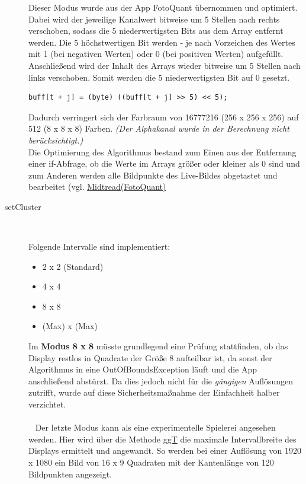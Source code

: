 \begin{description}
Dieser Modus wurde aus der App FotoQuant übernommen und optimiert. \\
Dabei wird der jeweilige Kanalwert bitweise um 5 Stellen nach rechts verschoben, sodass die 5 niederwertigsten Bits  aus dem Array entfernt werden. 
Die 5 höchstwertigen Bit werden - je nach Vorzeichen des Wertes mit 1 (bei negativen Werten) oder 0 (bei positiven Werten) aufgefüllt. 
\\
Anschließend wird der Inhalt des Arrays wieder bitweise um 5 Stellen nach links verschoben. Somit werden die 5 niederwertigsten Bit auf 0 gesetzt.
\\
\begin{lstlisting}
buff[t + j] = (byte) ((buff[t + j] >> 5) << 5);
\end{lstlisting}

Dadurch verringert sich der Farbraum von 16777216 (256 x 256 x 256) auf 512 (8 x 8 x 8) Farben. \textit{(Der Alphakanal wurde in der Berechnung nicht berücksichtigt.)} \\
Die Optimierung des Algorithmus bestand zum Einen aus der Entfernung einer if-Abfrage, ob die Werte im Arrays größer oder kleiner als 0 sind und zum Anderen werden alle Bildpunkte des Live-Bildes abgetastet und bearbeitet (vgl. \hyperref[fig:quant_mid]{Midtread(FotoQuant)} 


\item[setCluster]~\par
\label{intervall}
Folgende Intervalle sind implementiert:
\begin{itemize}
\item 2 x 2 (Standard)
\item 4 x 4 
\item 8 x 8
\item (Max) x (Max)
\end{itemize}
Im \textbf{Modus 8 x 8} müsste grundlegend eine Prüfung stattfinden, ob das Display restlos in Quadrate der Größe 8 aufteilbar ist, da sonst der Algorithmus in eine OutOfBoundsException läuft und die App anschließend abstürzt. Da dies jedoch nicht für die \textit{gängigen} Auflösungen zutrifft, wurde auf diese Sicherheitsmaßnahme der Einfachheit halber verzichtet. \\
\\\
\label{max}
Der letzte Modus kann als eine experimentelle Spielerei angesehen werden. Hier wird über die Methode \hyperref[ggt]{ggT} die maximale Intervallbreite des Displays ermittelt und angewandt. So werden bei einer Auflösung von 1920 x 1080 ein Bild von 16 x 9 Quadraten mit der Kantenlänge von 120 Bildpunkten angezeigt.\\




\end{description}
